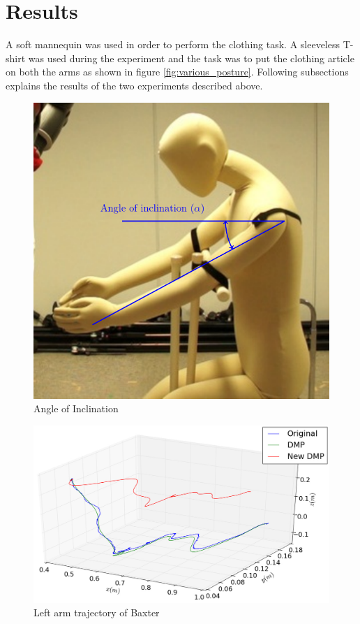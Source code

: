 \documentclass[sigconf]{acmart}
\begin{document}
\section{Results}
\label{sec:results}
A soft mannequin was used in order to perform the clothing task. A sleeveless T-shirt was used during the experiment and the task was to put the clothing article on both the arms as shown in figure \ref{fig:various_posture}. Following subsections explains the results of the two experiments described above.

\begin{figure}
	\includegraphics[width=\linewidth]{inclination}
	\caption{Angle of Inclination}
	\label{fig:inclination}
\end{figure}

\begin{figure}
	\includegraphics[width=\linewidth]{trajectory}
	\caption{Left arm trajectory of Baxter}
	\label{fig:trajectory}
\end{figure}
\end{document}
